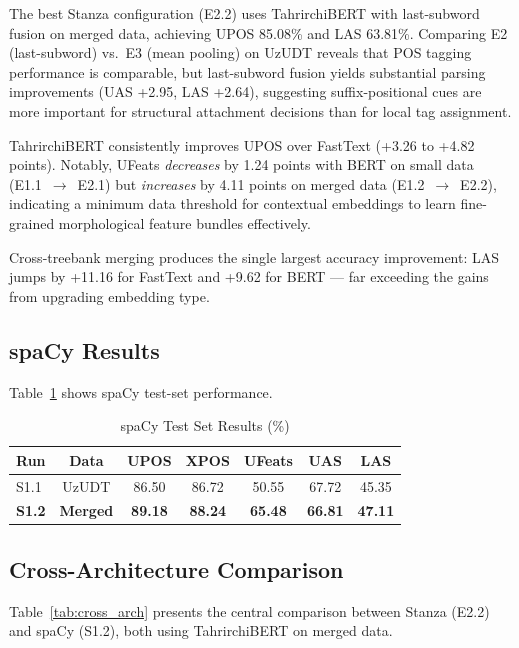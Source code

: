 \documentclass[10pt,conference,a4paper]{IEEEtran_EDM}
\begin{document}
The best Stanza configuration (E2.2) uses TahrirchiBERT with last-subword fusion on merged data, achieving UPOS 85.08\% and LAS 63.81\%. Comparing E2 (last-subword) vs.\ E3 (mean pooling) on UzUDT reveals that POS tagging performance is comparable, but last-subword fusion yields substantial parsing improvements (UAS +2.95, LAS +2.64), suggesting suffix-positional cues are more important for structural attachment decisions than for local tag assignment.

TahrirchiBERT consistently improves UPOS over FastText (+3.26 to +4.82 points). Notably, UFeats \textit{decreases} by 1.24 points with BERT on small data (E1.1~$\to$~E2.1) but \textit{increases} by 4.11 points on merged data (E1.2~$\to$~E2.2), indicating a minimum data threshold for contextual embeddings to learn fine-grained morphological feature bundles effectively.

Cross-treebank merging produces the single largest accuracy improvement: LAS jumps by +11.16 for FastText and +9.62 for BERT --- far exceeding the gains from upgrading embedding type.

\subsection{spaCy Results}

Table~\ref{tab:spacy_results} shows spaCy test-set performance.

\begin{table}[htbp]
\caption{spaCy Test Set Results (\%)}
\begin{center}
\begin{tabular}{lcccccc}
\toprule
\textbf{Run} & \textbf{Data} & \textbf{UPOS} & \textbf{XPOS} & \textbf{UFeats} & \textbf{UAS} & \textbf{LAS} \\
\midrule
S1.1 & UzUDT & 86.50 & 86.72 & 50.55 & 67.72 & 45.35 \\
\textbf{S1.2} & \textbf{Merged} & \textbf{89.18} & \textbf{88.24} & \textbf{65.48} & \textbf{66.81} & \textbf{47.11} \\
\bottomrule
\end{tabular}
\label{tab:spacy_results}
\end{center}
\end{table}

\subsection{Cross-Architecture Comparison}

Table~\ref{tab:cross_arch} presents the central comparison between Stanza (E2.2) and spaCy (S1.2), both using TahrirchiBERT on merged data.
\end{document}
